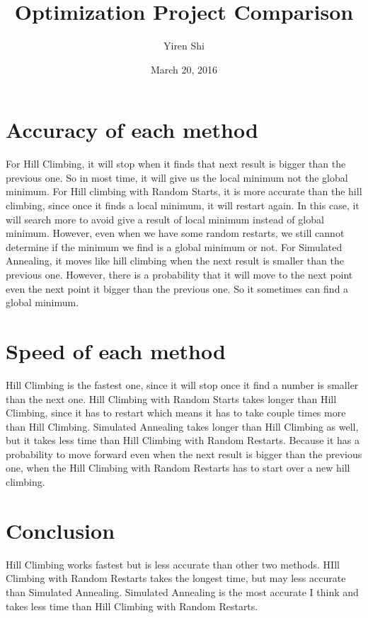 \documentclass[12pt, oneside]{report}
\title{Optimization Project Comparison}
\author{Yiren Shi}
\date{March 20, 2016}
\begin{document}
\maketitle

\section{Accuracy of each method}
For Hill Climbing, it will stop when it finds that next result is bigger than the previous one. So in most time, it will give us the local minimum not the global minimum.
For Hill climbing with Random Starts, it is more accurate than the hill climbing, since once it finds a local minimum, it will restart again. In this case, it will search more to avoid give a result of local minimum instead of global minimum. However, even when we have some random restarts, we still cannot determine if the minimum we find is a global minimum or not.
For Simulated Annealing, it moves like hill climbing when the next result is smaller than the previous one. However, there is a probability that it will move to the next point even the next point it bigger than the previous one. So it sometimes can find a global minimum.

\section{Speed of each method}
Hill Climbing is the fastest one, since it will stop once it find a number is smaller than the next one. Hill Climbing with Random Starts takes longer than Hill Climbing, since it has to restart which means it has to take couple times more than Hill Climbing. Simulated Annealing takes longer than Hill Climbing as well, but it takes less time than Hill Climbing with Random Restarts. Because it has a probability to move forward even when the next result is bigger than the previous one, when the Hill Climbing with Random Restarts has to start over a new hill climbing.

\section{Conclusion}
Hill Climbing works fastest but is less accurate than other two methods. HIll Climbing with Random Restarts takes the longest time, but may less accurate than Simulated Annealing. Simulated Annealing is the most accurate I think and takes less time than Hill Climbing with Random Restarts. 
\end{document}
